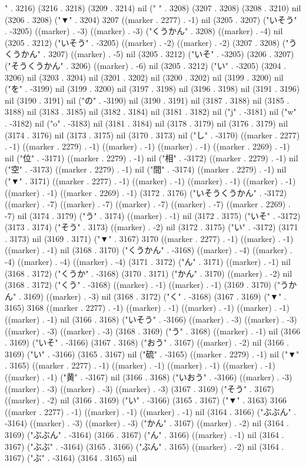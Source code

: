 " . 3216) (3216 . 3218) (3209 . 3214) nil (" " . 3208) (3207 . 3208) (3208 . 3210) nil (3206 . 3208) ("▼" . 3204) 3207 ((marker . 2277) . -1) nil (3205 . 3207) ("いそう" . -3205) ((marker) . -3) ((marker) . -3) ("くうかん" . 3208) ((marker) . -4) nil (3205 . 3212) ("いそう" . -3205) ((marker) . -2) ((marker) . -2) (3207 . 3208) ("うくうかん" . 3207) ((marker) . -5) nil (3205 . 3212) ("いそ" . -3205) (3206 . 3207) ("そうくうかん" . 3206) ((marker) . -6) nil (3205 . 3212) ("い" . -3205) (3204 . 3206) nil (3203 . 3204) nil (3201 . 3202) nil (3200 . 3202) nil (3199 . 3200) nil ("を" . -3199) nil (3199 . 3200) nil (3197 . 3198) nil (3196 . 3198) nil (3191 . 3196) nil (3190 . 3191) nil ("の" . -3190) nil (3190 . 3191) nil (3187 . 3188) nil (3185 . 3188) nil (3183 . 3185) nil (3182 . 3184) nil (3181 . 3182) nil ("j" . -3181) nil ("w" . -3182) nil ("o" . -3183) nil (3181 . 3184) nil (3178 . 3179) nil (3176 . 3179) nil (3174 . 3176) nil (3173 . 3175) nil (3170 . 3173) nil ("し" . -3170) ((marker . 2277) . -1) ((marker . 2279) . -1) ((marker) . -1) ((marker) . -1) ((marker . 2269) . -1) nil ("位" . -3171) ((marker . 2279) . -1) nil ("相" . -3172) ((marker . 2279) . -1) nil ("空" . -3173) ((marker . 2279) . -1) nil ("間" . -3174) ((marker . 2279) . -1) nil ("▼" . 3171) ((marker . 2277) . -1) ((marker) . -1) ((marker) . -1) ((marker) . -1) ((marker) . -1) ((marker . 2269) . -1) (3172 . 3176) ("いそうくうかん" . -3172) ((marker) . -7) ((marker) . -7) ((marker) . -7) ((marker) . -7) ((marker . 2269) . -7) nil (3174 . 3179) ("う" . 3174) ((marker) . -1) nil (3172 . 3175) ("いそ" . -3172) (3173 . 3174) ("そう" . 3173) ((marker) . -2) nil (3172 . 3175) ("い" . -3172) (3171 . 3173) nil (3169 . 3171) ("▼" . 3167) 3170 ((marker . 2277) . -1) ((marker) . -1) ((marker) . -1) nil (3168 . 3170) ("くうかん" . -3168) ((marker) . -4) ((marker) . -4) ((marker) . -4) ((marker) . -4) (3171 . 3172) ("ん" . 3171) ((marker) . -1) nil (3168 . 3172) ("くうか" . -3168) (3170 . 3171) ("かん" . 3170) ((marker) . -2) nil (3168 . 3172) ("くう" . -3168) ((marker) . -1) ((marker) . -1) (3169 . 3170) ("うかん" . 3169) ((marker) . -3) nil (3168 . 3172) ("く" . -3168) (3167 . 3169) ("▼" . 3165) 3168 ((marker . 2277) . -1) ((marker) . -1) ((marker) . -1) ((marker) . -1) ((marker) . -1) nil (3166 . 3168) ("いそう" . -3166) ((marker) . -3) ((marker) . -3) ((marker) . -3) ((marker) . -3) (3168 . 3169) ("う" . 3168) ((marker) . -1) nil (3166 . 3169) ("いそ" . -3166) (3167 . 3168) ("おう" . 3167) ((marker) . -2) nil (3166 . 3169) ("い" . -3166) (3165 . 3167) nil ("硫" . -3165) ((marker . 2279) . -1) nil ("▼" . 3165) ((marker . 2277) . -1) ((marker) . -1) ((marker) . -1) ((marker) . -1) ((marker) . -1) ("黄" . -3167) nil (3166 . 3168) ("いおう" . -3166) ((marker) . -3) ((marker) . -3) ((marker) . -3) ((marker) . -3) (3167 . 3169) ("そう" . 3167) ((marker) . -2) nil (3166 . 3169) ("い" . -3166) (3165 . 3167) ("▼" . 3163) 3166 ((marker . 2277) . -1) ((marker) . -1) ((marker) . -1) nil (3164 . 3166) ("ぶぶん" . -3164) ((marker) . -3) ((marker) . -3) ("かん" . 3167) ((marker) . -2) nil (3164 . 3169) ("ぶぶん" . -3164) (3166 . 3167) ("ん" . 3166) ((marker) . -1) nil (3164 . 3167) ("ぶぶ" . -3164) (3165 . 3166) ("ぶん" . 3165) ((marker) . -2) nil (3164 . 3167) ("ぶ" . -3164) (3164 . 3165) nil 